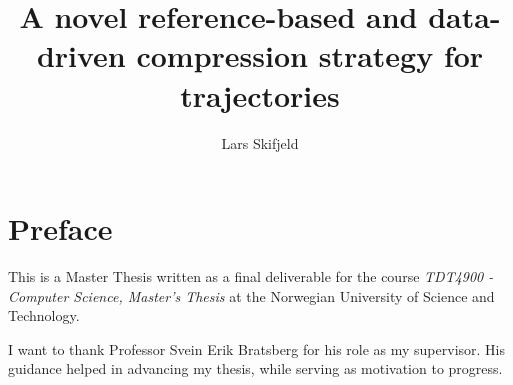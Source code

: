 \documentclass[british,titlepage,page]{ntnuthesis}
\title{A novel reference-based and data-driven compression strategy for trajectories}
\author{Lars Skifjeld}
\date{\ntnuthesisdate\space}
\begin{document}



\chapter*{Preface}
This is a Master Thesis written as a final deliverable for the course \textit{TDT4900 - Computer Science, Master's Thesis} at the Norwegian University of Science and Technology.

I want to thank Professor Svein Erik Bratsberg for his role as my supervisor. His guidance helped in advancing my thesis, while serving as motivation to progress.
\tableofcontents
\listoffigures
\lstlistoflistings

\printglossary[type=\acronymtype] %
\printglossary                    %





% 


% 

\chapter*{\bibname}
\printbibliography[heading=none]

\appendix
\end{document}
